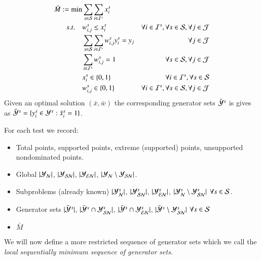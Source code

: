 \begin{enumerate}
\begin{align*}
	\bar{M}  := \min&  \sum_{s \in \S}\sum_{i \in \I^s} x^s_i \\
	s.t. \quad & w^s_{i,j} \le x^s_i & \forall i \in \I^s, \forall s \in \S, \forall j \in \J \\
		   &\sum_{s \in \S}\sum_{i \in \I^s} w^s_{i,j} y^s_i = y_j & \quad \forall j \in \J \\
		   &\sum_{i \in \I^s} w^s_{i,j} = 1 & \quad \forall s \in \S, \forall j \in \J  \\
		   & x^s_i \in \{0,1\} & \forall i \in \I^s, \forall s \in \S\\
		   & w^s_{i,j} \in \{0,1\} &\forall i \in \I^s, \forall s \in \S, \forall j \in \J \nonumber
\end{align*}
Given an optimal solution $(\bar{x},\bar{w})$ the corresponding generator sets $\Ycs$ is gives as $\Ycs = \{ y^s_i \in \Y^s : \bar{x}^s_i = 1\}$.

For each test we record:
\begin{itemize}
	\item Total points, supported points, extreme (supported) points, unsupported nondominated points.
	\item Global $\lvert \Yn \rvert$, $\lvert \Ysn \rvert$,  $\lvert \Yen \rvert$, $\lvert \Yn \setminus \Ysn \rvert$.
	\item Subproblems (already known)  $\lvert \Yn^s \rvert$, $\lvert \Ysn^s \rvert$,  $\lvert \Yen^s \rvert$, $\lvert \Yn^s \setminus \Ysn^s \rvert$ $\forall s \in \S$.
	\item Generator sets $\lvert \Ycs \rvert$, $\lvert \Ycs \cap \Ysn^s \rvert$, $\lvert \Ycs \cap \Yen^s \rvert$,  $\lvert \Ycs \setminus \Ysn^s \rvert$  $\forall s \in \S$
	\item $\bar{M}$
\end{itemize}



We will now define a more restricted sequence of generator sets which we call the \emph{local sequentially minimum sequence of generator sets}. 


\end{enumerate}
